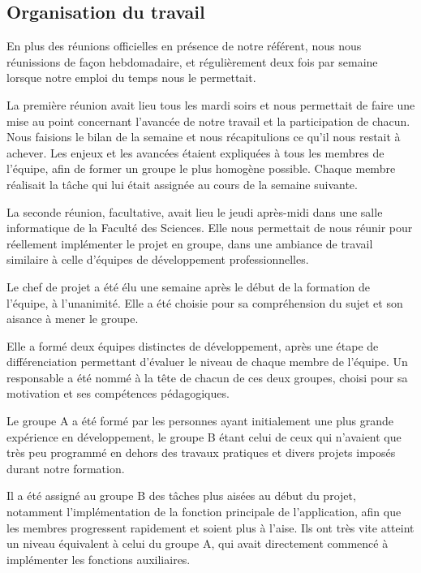 \documentclass[a4paper, 12pt]{article}
\begin{document}
\subsection{Organisation du travail}

	\par En plus des réunions officielles en présence de notre référent, nous nous réunissions de façon hebdomadaire, et régulièrement deux fois par semaine lorsque notre emploi du temps nous le permettait. 
	\par La première réunion avait lieu tous les mardi soirs et nous permettait de faire une mise au point concernant l'avancée de notre travail et la participation de chacun. Nous faisions le bilan de la semaine et nous récapitulions ce qu'il nous restait à achever. Les enjeux et les avancées étaient expliquées à tous les membres de l'équipe, afin de former un groupe le plus homogène possible. Chaque membre réalisait la tâche qui lui était assignée au cours de la semaine suivante.
	\par La seconde réunion, facultative, avait lieu le jeudi après-midi dans une salle informatique de la Faculté des Sciences. Elle nous permettait de nous réunir pour réellement implémenter le projet en groupe, dans une ambiance de travail similaire à celle d'équipes de développement professionnelles.
	\\
	\par Le chef de projet a été élu une semaine après le début de la formation de l'équipe, à l'unanimité. Elle a été choisie pour sa compréhension du sujet et son aisance à mener le groupe.
	\par Elle a formé deux équipes distinctes de développement, après une étape de différenciation permettant d'évaluer le niveau de chaque membre de l'équipe. Un responsable a été nommé à la tête de chacun de ces deux groupes, choisi pour sa motivation et ses compétences pédagogiques.
	\par Le groupe A a été formé par les personnes ayant initialement une plus grande expérience en développement, le groupe B étant celui de ceux qui n'avaient que très peu programmé en dehors des travaux pratiques et divers projets imposés durant notre formation.
	\par Il a été assigné au groupe B des tâches plus aisées au début du projet, notamment l'implémentation de la fonction principale de l'application, afin que les membres progressent rapidement et soient plus à l'aise. Ils ont très vite atteint un niveau équivalent à celui du groupe A, qui avait directement commencé à implémenter les fonctions auxiliaires.
\end{document}
